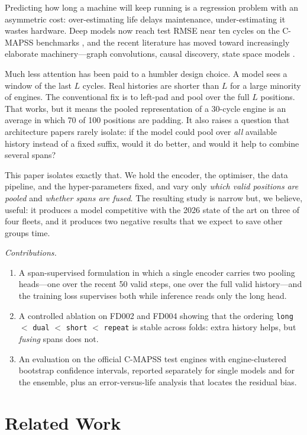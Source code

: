 \documentclass[journal,10pt]{IEEEtran}
\begin{document}
Predicting how long a machine will keep running is a regression problem with an
asymmetric cost: over-estimating life delays maintenance, under-estimating it
wastes hardware. Deep models now reach test RMSE near ten cycles on the C-MAPSS
benchmarks \cite{saxena2008}, and the recent literature has moved toward
increasingly elaborate machinery---graph convolutions, causal discovery, state
space models \cite{ast2026,mfssc2024,dkdgjln2026}.

Much less attention has been paid to a humbler design choice. A model sees a
window of the last $L$ cycles. Real histories are shorter than $L$ for a large
minority of engines. The conventional fix is to left-pad and pool over the full
$L$ positions. That works, but it means the pooled representation of a 30-cycle
engine is an average in which 70 of 100 positions are padding. It also raises a
question that architecture papers rarely isolate: if the model could pool over
\emph{all} available history instead of a fixed suffix, would it do better, and
would it help to combine several spans?

This paper isolates exactly that. We hold the encoder, the optimiser, the data
pipeline, and the hyper-parameters fixed, and vary only \emph{which valid positions}
\emph{are pooled} and \emph{whether spans are fused}. The resulting study is narrow but,
we believe, useful: it produces a model competitive with the 2026 state of the art
on three of four fleets, and it produces two negative results that we expect to
save other groups time.

\emph{Contributions.}
\begin{enumerate}
\item A span-supervised formulation in which a single encoder carries two pooling
heads---one over the recent 50 valid steps, one over the full valid history---and
the training loss supervises both while inference reads only the long head.
\item A controlled ablation on FD002 and FD004 showing that the ordering
\texttt{long} $<$ \texttt{dual} $<$ \texttt{short} $<$ \texttt{repeat} is stable
across folds: extra history helps, but \emph{fusing} spans does not.
\item An evaluation on the official C-MAPSS test engines with engine-clustered
bootstrap confidence intervals, reported separately for single models and for the
ensemble, plus an error-versus-life analysis that locates the residual bias.
\end{enumerate}

\section{Related Work}
\end{document}
